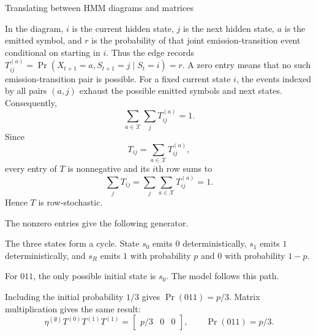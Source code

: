\begin{exercise}[Core]{Translating between HMM diagrams and matrices}
  \begin{solution}
    \begin{parts}
      \item In the diagram, $i$ is the current hidden state, $j$ is the next
        hidden state, $a$ is the emitted symbol, and $r$ is the probability of
        that joint emission-transition event conditional on starting in $i$.
        Thus the edge records
        $T^{(a)}_{ij}=\Pr(X_{t+1}=a,S_{t+1}=j\mid S_t=i)=r$.
        A zero entry means that no such emission-transition pair is possible.
        For a fixed current state $i$, the events indexed by all pairs $(a,j)$
        exhaust the possible emitted symbols and next states. Consequently,
        \[
          \sum_{a\in\mathcal X}\sum_j T^{(a)}_{ij}=1.
        \]
        Since
        \[
          T_{ij}=\sum_{a\in\mathcal X}T^{(a)}_{ij},
        \]
        every entry of $T$ is nonnegative and its $i$th row sums to
        \[
          \sum_jT_{ij}
            =\sum_j\sum_{a\in\mathcal X}T^{(a)}_{ij}=1.
        \]
        Hence $T$ is row-stochastic.

      \item
        \begin{subparts}
          \item The nonzero entries give the following generator.
            \par\nobreak
            {\centering
              \par}
            The three states form a cycle. State $s_0$ emits $0$
            deterministically, $s_1$ emits $1$ deterministically, and $s_R$ emits
            $1$ with probability $p$ and $0$ with probability $1-p$.

          \item For $011$, the only possible initial state is $s_0$. The model
            follows this path.
            \par\nobreak
            {\centering{}\par}
            Including the initial probability $1/3$ gives
            $\Pr(011)=p/3$. Matrix multiplication gives the same result:
            \[
              \eta^{(\emptyset)}T^{(0)}T^{(1)}T^{(1)}
                =\begin{bmatrix}p/3&0&0\end{bmatrix},
              \qquad
              \Pr(011)=p/3.
            \]


\end{subparts}
\end{parts}
\end{solution}
\end{exercise}

